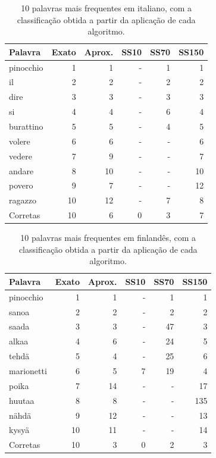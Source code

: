 \documentclass[mirror, portugues]{revdetua}
\begin{document}
\begin{table}[H]
\centering
\caption{10 palavras mais frequentes em italiano, com a classificação obtida a partir da aplicação de cada algoritmo.}
\label{table:rank10_it}
\begin{tabular}{lrrrrr}
\toprule
Palavra & Exato & Aprox. & SS10 & SS70 & SS150 \\
\midrule
pinocchio & 1 & 1 & - & 1 & 1 \\
il & 2 & 2 & - & 2 & 2 \\
dire & 3 & 3 & - & 3 & 3 \\
si & 4 & 4 & - & 6 & 4 \\
burattino & 5 & 5 & - & 4 & 5 \\
volere & 6 & 6 & - & - & 6 \\
vedere & 7 & 9 & - & - & 7 \\
andare & 8 & 10 & - & - & 10 \\
povero & 9 & 7 & - & - & 12 \\
ragazzo & 10 & 12 & - & 7 & 8 \\
\midrule
Corretas & 10 & 6 & 0 & 3 & 7 \\
\bottomrule
\end{tabular}
\end{table}

\begin{table}[H]
\centering
\caption{10 palavras mais frequentes em finlandês, com a classificação obtida a partir da aplicação de cada algoritmo.}
\label{table:rank10_fi}
\begin{tabular}{lrrrrr}
\toprule
Palavra & Exato & Aprox. & SS10 & SS70 & SS150 \\
\midrule
pinocchio & 1 & 1 & - & 1 & 1 \\
sanoa & 2 & 2 & - & 2 & 2 \\
saada & 3 & 3 & - & 47 & 3 \\
alkaa & 4 & 6 & - & 24 & 5 \\
tehdä & 5 & 4 & - & 25 & 6 \\
marionetti & 6 & 5 & 7 & 19 & 4 \\
poika & 7 & 14 & - & - & 17 \\
huutaa & 8 & 8 & - & - & 135 \\
nähdä & 9 & 12 & - & - & 13 \\
kysyä & 10 & 11 & - & - & 14 \\
\midrule
Corretas & 10 & 3 & 0 & 2 & 3 \\
\bottomrule
\end{tabular}
\end{table}
\end{document}
